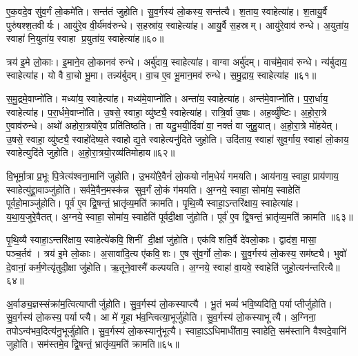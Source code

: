 ए॒क॒वदे॒व सु॑व॒र्गं लो॒कमे॑ति। सन्त॑तं जुहोति। सु॒व॒र्गस्य॑ लो॒कस्य॒ सन्त॑त्यै। श॒ताय॒ स्वाहेत्या॑ह। श॒तायु॒र्वै पुरु॑षश्श॒तवीर्यः। आयु॑रे॒व वी॒र्य॑मव॑रुन्धे। स॒हस्रा॑य॒ स्वाहेत्या॑ह। आयु॒र्वै स॒हस्रम्। आयु॑रे॒वाव॑ रुन्धे। अ॒युता॑य॒ स्वाहा॑ नि॒युता॑य॒ स्वाहा प्र॒युता॑य॒ स्वाहेत्या॑ह॥६०॥

त्रय॑ इ॒मे लो॒काः। इ॒माने॒व लो॒कानव॑ रुन्धे। अर्बु॑दाय॒ स्वाहेत्या॑ह। वाग्वा अर्बु॑दम्। वाच॑मे॒वाव॑ रुन्धे। न्य॑र्बुदाय॒ स्वाहेत्या॑ह। यो वै वा॒चो भू॒मा। तन्न्य॑र्बुदम्। वा॒च ए॒व भू॒मान॒मव॑ रुन्धे। स॒मु॒द्राय॒ स्वाहेत्या॑ह ॥६१॥

स॒मु॒द्रमे॒वाप्नो॑ति। मध्या॑य॒ स्वाहेत्या॑ह। मध्य॑मे॒वाप्नो॑ति। अन्ता॑य॒ स्वाहेत्या॑ह। अन्त॑मे॒वाप्नो॑ति। प॒रा॒र्धाय॒ स्वाहेत्या॑ह। प॒रा॒र्धमे॒वाप्नो॑ति। उ॒षसे॒ स्वाहा॒ व्यु॑ष्ट्यै॒ स्वाहेत्या॑ह। रात्रि॒र्वा उ॒षाः। अह॒र्व्यु॑ष्टिः। अ॒हो॒रा॒त्रे ए॒वाव॑रुन्धे। अथो॑ अहोरा॒त्रयो॑रे॒व प्रति॑तिष्ठति। ता यदु॒भयी॒र्दिवा॑ वा॒ नक्तं॑ वा जुहु॒यात्। अ॒हो॒रा॒त्रे मो॑हयेत्। उ॒षसे॒ स्वाहा॒ व्यु॑ष्ट्यै॒ स्वाहो॑देष्य॒ते स्वाहोद्य॒ते स्वाहेत्यनु॑दिते जुहोति। उदि॑ताय॒ स्वाहा॑ सुव॒र्गाय॒ स्वाहा॑ लो॒काय॒ स्वाहेत्युदि॑ते जुहोति। अ॒हो॒रा॒त्रयो॒रव्य॑तिमोहाय॥६२॥\anuvakamend[ए॒को॒त्त॒रं जु॑होति प्र॒युता॑य॒ स्वाहेत्या॑ह समु॒द्राय॒ स्वाहेत्या॒हाह॒र्व्यु॑ष्टिस्स॒प्त च॑]

वि॒भूर्मा॒त्रा प्र॒भूः पि॒त्रेत्य॑श्वना॒मानि॑ जुहोति। उ॒भयो॑रे॒वैनं॑ लो॒कयोर्नाम॒धेयं॑ गमयति। आय॑नाय॒ स्वाहा॒ प्राय॑णाय॒ स्वाहेत्यु॑द्द्रा॒वाञ्जु॑होति। सर्व॑मे॒वैन॒मस्क॑न्न सुव॒र्गं लो॒कं ग॑मयति। अ॒ग्नये॒ स्वाहा॒ सोमा॑य॒ स्वाहेति॑ पूर्वहो॒माञ्जु॑होति। पूर्व॑ ए॒व द्वि॒षन्तं॒ भ्रातृ॑व्य॒मति॑ क्रामति। पृ॒थि॒व्यै स्वाहा॒ऽन्तरि॑क्षाय॒ स्वाहेत्या॑ह। य॒था॒य॒जुरे॒वैतत्। अ॒ग्नये॒ स्वाहा॒ सोमा॑य॒ स्वाहेति॑ पूर्वदी॒क्षा जु॑होति। पूर्व॑ ए॒व द्वि॒षन्तं॒ भ्रातृ॑व्य॒मति॑ क्रामति ॥६३॥

पृ॒थि॒व्यै स्वाहा॒ऽन्तरि॑क्षाय॒ स्वाहेत्ये॑कवि॒शिनीं दी॒क्षां जु॑होति। एक॑विशति॒र्वै दे॑वलो॒काः। द्वाद॑श॒ मासा॒ पञ्च॒र्तव॑। त्रय॑ इ॒मे लो॒काः। अ॒सावा॑दि॒त्य ए॑कवि॒शः। ए॒ष सु॑व॒र्गो लो॒कः। सु॒व॒र्गस्य॑ लो॒कस्य॒ सम॑ष्ट्यै। भुवो॑ दे॒वानां॒ कर्म॒णेत्यृ॑तुदी॒क्षा जु॑होति। ऋ॒तूने॒वास्मै॑ कल्पयति। अ॒ग्नये॒ स्वाहा॑ वा॒यवे॒ स्वाहेति॑ जुहो॒त्यन॑न्तरित्यै॥६४॥

अ॒र्वाङ्य॒ज्ञस्संक्रा॑म॒त्वित्याप्तीर्जुहोति। सु॒व॒र्गस्य॑ लो॒कस्याप्त्यै। भू॒तं भव्यं॑ भवि॒ष्यदिति॒ पर्याप्तीर्जुहोति। सु॒व॒र्गस्य॑ लो॒कस्य॒ पर्याप्त्यै। आ मे॑ गृ॒हा भ॑व॒न्त्वित्या॒भूर्जु॑होति। सु॒व॒र्गस्य॑ लो॒कस्याभूत्यै। अ॒ग्निना॒ तपोऽन्व॑भव॒दित्य॑नु॒भूर्जु॑होति। सु॒व॒र्गस्य॑ लो॒कस्यानु॑भूत्यै। स्वाहा॒ऽऽधिमाधी॑ताय॒ स्वाहेति॒ सम॑स्तानि वैश्वदे॒वानि॑ जुहोति। सम॑स्तमे॒व द्वि॒षन्तं॒ भ्रातृ॑व्य॒मति॑ क्रामति॥६५॥

